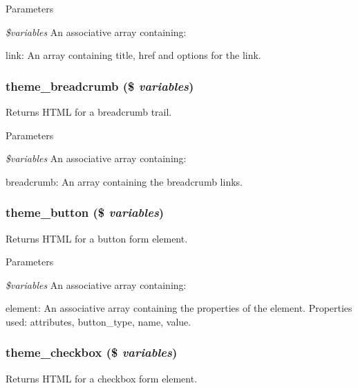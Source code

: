 \begin{DoxyParams}{Parameters}
\item[{\em \$variables}]An associative array containing:
\begin{DoxyItemize}
\item link: An array containing title, href and options for the link. 
\end{DoxyItemize}\end{DoxyParams}
\hypertarget{group__themeable_gaf05700c211b33b8ae6b258e2946b782c}{
\subsubsection[{theme\_\-breadcrumb}]{\setlength{\rightskip}{0pt plus 5cm}theme\_\-breadcrumb (\$ {\em variables})}}
\label{group__themeable_gaf05700c211b33b8ae6b258e2946b782c}
Returns HTML for a breadcrumb trail.


\begin{DoxyParams}{Parameters}
\item[{\em \$variables}]An associative array containing:
\begin{DoxyItemize}
\item breadcrumb: An array containing the breadcrumb links. 
\end{DoxyItemize}\end{DoxyParams}
\hypertarget{group__themeable_ga6f85ebe1bce115aaa66a8e0eb4c7e001}{
\subsubsection[{theme\_\-button}]{\setlength{\rightskip}{0pt plus 5cm}theme\_\-button (\$ {\em variables})}}
\label{group__themeable_ga6f85ebe1bce115aaa66a8e0eb4c7e001}
Returns HTML for a button form element.


\begin{DoxyParams}{Parameters}
\item[{\em \$variables}]An associative array containing:
\begin{DoxyItemize}
\item element: An associative array containing the properties of the element. Properties used: attributes, button\_\-type, name, value. 
\end{DoxyItemize}\end{DoxyParams}
\hypertarget{group__themeable_ga564057bbdee3072a89cee1d6e1d54168}{
\subsubsection[{theme\_\-checkbox}]{\setlength{\rightskip}{0pt plus 5cm}theme\_\-checkbox (\$ {\em variables})}}
\label{group__themeable_ga564057bbdee3072a89cee1d6e1d54168}
Returns HTML for a checkbox form element.


